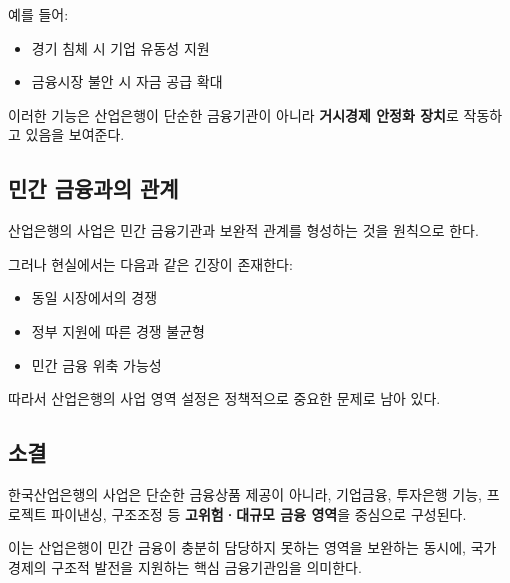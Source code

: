 예를 들어:
\begin{itemize}
    \item 경기 침체 시 기업 유동성 지원
    \item 금융시장 불안 시 자금 공급 확대
\end{itemize}

이러한 기능은 산업은행이 단순한 금융기관이 아니라 \textbf{거시경제 안정화 장치}로 작동하고 있음을 보여준다.

\subsection{민간 금융과의 관계}

산업은행의 사업은 민간 금융기관과 보완적 관계를 형성하는 것을 원칙으로 한다.

그러나 현실에서는 다음과 같은 긴장이 존재한다:

\begin{itemize}
    \item 동일 시장에서의 경쟁
    \item 정부 지원에 따른 경쟁 불균형
    \item 민간 금융 위축 가능성
\end{itemize}

따라서 산업은행의 사업 영역 설정은 정책적으로 중요한 문제로 남아 있다.

\subsection{소결}

한국산업은행의 사업은 단순한 금융상품 제공이 아니라, 기업금융, 투자은행 기능, 프로젝트 파이낸싱, 구조조정 등 \textbf{고위험·대규모 금융 영역}을 중심으로 구성된다.

이는 산업은행이 민간 금융이 충분히 담당하지 못하는 영역을 보완하는 동시에, 국가 경제의 구조적 발전을 지원하는 핵심 금융기관임을 의미한다.